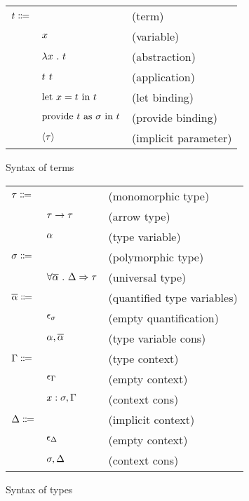 \documentclass[acmlarge]{acmart}
\begin{document}
  \begin{figure}[h!]
    \begin{mdframed}

      \begin{tabular}{l l l}
        $t \Coloneqq $ & & (term) \\
        & $x$ & (variable) \\
        & $\lambda x \ . \ t$ & (abstraction) \\
        & $t \ t$ & (application) \\
        & $\text{let } x = t \text{ in } t$ & (let binding) \\
        & $\text{provide } t \text{ as } \sigma \text{ in } t$ & (provide binding) \\
        & $\left\langle \tau \right\rangle$ & (implicit parameter)
      \end{tabular}

    \end{mdframed}
    \caption{Syntax of terms}
    \label{fig:terms_syntax}
  \end{figure}

  \begin{figure}[h!]
    \begin{mdframed}

      \begin{tabular}{l l l}
        $\tau \Coloneqq$ & & (monomorphic type) \\
        & $\tau \rightarrow \tau$ & (arrow type) \\
        & $\alpha$ & (type variable) \\
        $\sigma \Coloneqq$ & & (polymorphic type) \\
        & $\forall \overline{\alpha} \ . \ \Delta \Rightarrow \tau$ & (universal type) \\
        $\overline{\alpha} \Coloneqq$ & & (quantified type variables) \\
        & $\epsilon_{\sigma}$ & (empty quantification) \\
        & $\alpha, \overline{\alpha}$ & (type variable cons) \\
        $\Gamma \Coloneqq$ & & (type context) \\
        & $\epsilon_{\Gamma}$ & (empty context) \\
        & $x : \sigma, \Gamma$ & (context cons) \\
        $\Delta \Coloneqq$ & & (implicit context) \\
        & $\epsilon_{\Delta}$ & (empty context) \\
        & $\sigma, \Delta$ & (context cons)
      \end{tabular}

    \end{mdframed}
    \caption{Syntax of types}
    \label{fig:types_syntax}
  \end{figure}
\end{document}
